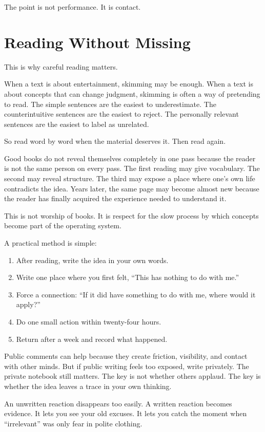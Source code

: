 The point is not performance. It is contact.

\section*{Reading Without Missing}

This is why careful reading matters.

When a text is about entertainment, skimming may be enough. When a text is about concepts that can change judgment, skimming is often a way of pretending to read. The simple sentences are the easiest to underestimate. The counterintuitive sentences are the easiest to reject. The personally relevant sentences are the easiest to label as unrelated.

So read word by word when the material deserves it. Then read again.

Good books do not reveal themselves completely in one pass because the reader is not the same person on every pass. The first reading may give vocabulary. The second may reveal structure. The third may expose a place where one's own life contradicts the idea. Years later, the same page may become almost new because the reader has finally acquired the experience needed to understand it.

This is not worship of books. It is respect for the slow process by which concepts become part of the operating system.

A practical method is simple:

\begin{enumerate}
\item After reading, write the idea in your own words.
\item Write one place where you first felt, ``This has nothing to do with me.''
\item Force a connection: ``If it did have something to do with me, where would it apply?''
\item Do one small action within twenty-four hours.
\item Return after a week and record what happened.
\end{enumerate}

Public comments can help because they create friction, visibility, and contact with other minds. But if public writing feels too exposed, write privately. The private notebook still matters. The key is not whether others applaud. The key is whether the idea leaves a trace in your own thinking.

An unwritten reaction disappears too easily. A written reaction becomes evidence. It lets you see your old excuses. It lets you catch the moment when ``irrelevant'' was only fear in polite clothing.

